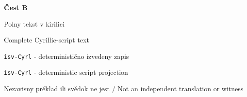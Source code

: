 \documentclass[11pt]{article}
\begin{document}
\label{part:cyrl}
\thispagestyle{empty}
\begin{center}
\vspace*{5cm}
{\sffamily\color{NoetherBlue}\Huge\bfseries Čest B\par}
\vspace{0.6cm}
{\sffamily\LARGE Polny tekst v kirilici\par}
{\sffamily\Large Complete Cyrillic-script text\par}
\vfill
{\large \texttt{isv-Cyrl} - deterministično izvedeny zapis\par}
{\large \texttt{isv-Cyrl} - deterministic script projection\par}
{\small Nezavisny prěklad ili svědok ne jest / Not an independent translation or witness\par}
\end{center}
\clearpage

\end{document}
